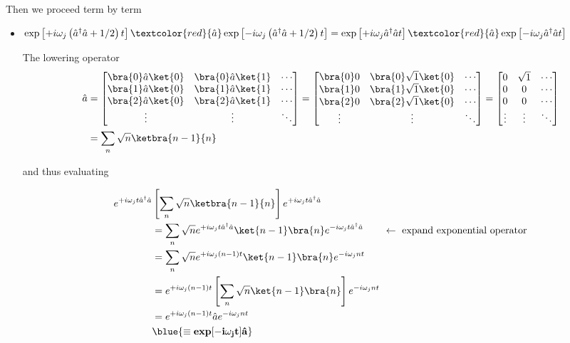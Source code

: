 \noindent Then we proceed term by term
\begin{itemize}
	\item $\exp\left[+i\omega_j\left(\hat{a}^\dagger\hat{a}+{1}/{2}\right)t\right]\textcolor{red}{\hat{a}}\exp\left[-i\omega_j\left(\hat{a}^\dagger\hat{a}+{1}/{2}\right)t\right] = \exp\left[+i\omega_j\hat{a}^\dagger\hat{a}t\right]\textcolor{red}{\hat{a}}\exp\left[-i\omega_j\hat{a}^\dagger\hat{a}t\right]$
	
	The lowering operator \textcolor{red}{
		\begin{equation}
		\begin{aligned}
		\hat{a} & =
		\begin{bmatrix}
		\bra{0}\hat{a}\ket{0} & \bra{0}\hat{a}\ket{1} & \cdots\\
		\bra{1}\hat{a}\ket{0} & \bra{1}\hat{a}\ket{1} & \cdots\\
		\bra{2}\hat{a}\ket{0} & \bra{2}\hat{a}\ket{1} & \cdots\\
		\vdots & \vdots & \ddots\\
		\end{bmatrix}
		= \begin{bmatrix}
		\bra{0}0 & \bra{0}\sqrt{1}\ket{0} & \cdots\\
		\bra{1}0 & \bra{1}\sqrt{1}\ket{0} & \cdots\\
		\bra{2}0 & \bra{2}\sqrt{1}\ket{0} & \cdots\\
		\vdots & \vdots & \ddots\\	
		\end{bmatrix}
		= \begin{bmatrix}
		0 & \sqrt{1} & \cdots\\
		0 & 0 & \cdots\\
		0 & 0 & \cdots\\
		\vdots & \vdots & \ddots\\	
		\end{bmatrix}\\
		& = \sum_n\sqrt{n}\ketbra{n-1}{n}
		\end{aligned}
		\end{equation}}
	
	\noindent and thus evaluating
	
	\begin{equation}
	\begin{aligned}
	e^{+i\omega_jt\hat{a}^\dagger\hat a} & \left[\sum_n\sqrt{n}\ketbra{n-1}{n}\right]e^{+i\omega_jt\hat{a}^\dagger\hat a}\\
	& = \sum_n \sqrt{n}e^{+i\omega_jt\hat{a}^\dagger\hat a}\ket{n-1}\bra{n}e^{-i\omega_jt\hat{a}^\dagger\hat a} \qquad \leftarrow\text{ expand exponential operator}\\
	& = \sum_n \sqrt{n}e^{+i\omega_j(n-1)t}\ket{n-1}\bra{n}e^{-i\omega_jnt}\\
	& = e^{+i\omega_j(n-1)t}\left[\sum_n \sqrt{n}\ket{n-1}\bra{n}\right]e^{-i\omega_jnt}\\
	& = e^{+i\omega_j(n-1)t}\hat{a}e^{-i\omega_jnt}\\ & \blue{\mathbf{\equiv  \text{\textbf{exp}}[-i\omega_jt]\hat{a}}}
	\end{aligned}
	\end{equation}
	

\end{itemize}
